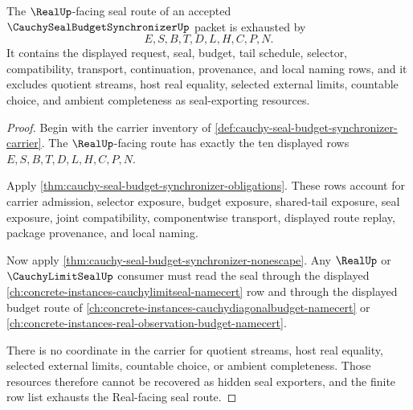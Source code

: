 \begin{theorem}
\label{thm:cauchy-seal-budget-synchronizer-real-seal-budget-exhaustion}
The $\RealUp$-facing seal route of an accepted $\CauchySealBudgetSynchronizerUp$ packet is exhausted by
$$
E,S,B,T,D,L,H,C,P,N.
$$
It contains the displayed request, seal, budget, tail schedule, selector, compatibility, transport, continuation, provenance, and local naming rows, and it excludes quotient streams, host real equality, selected external limits, countable choice, and ambient completeness as seal-exporting resources.
\end{theorem}
\begin{proof}
Begin with the carrier inventory of \autoref{def:cauchy-seal-budget-synchronizer-carrier}. The $\RealUp$-facing route has exactly the ten displayed rows $E,S,B,T,D,L,H,C,P,N$.

Apply \autoref{thm:cauchy-seal-budget-synchronizer-obligations}. These rows account for carrier admission, selector exposure, budget exposure, shared-tail exposure, seal exposure, joint compatibility, componentwise transport, displayed route replay, package provenance, and local naming.

Now apply \autoref{thm:cauchy-seal-budget-synchronizer-nonescape}. Any $\RealUp$ or $\CauchyLimitSealUp$ consumer must read the seal through the displayed \autoref{ch:concrete-instances-cauchylimitseal-namecert} row and through the displayed budget route of \autoref{ch:concrete-instances-cauchydiagonalbudget-namecert} or \autoref{ch:concrete-instances-real-observation-budget-namecert}.

There is no coordinate in the carrier for quotient streams, host real equality, selected external limits, countable choice, or ambient completeness. Those resources therefore cannot be recovered as hidden seal exporters, and the finite row list exhausts the Real-facing seal route.
\end{proof}

